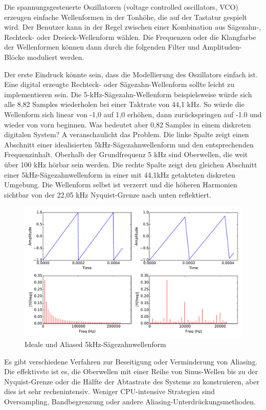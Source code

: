 Die spannungsgesteuerte Oszillatoren (voltage controlled oscillators, VCO) erzeugen einfache Wellenformen in der Tonhöhe, die auf der Tastatur gespielt wird. Der Benutzer kann in der Regel zwischen einer Kombination aus Sägezahn-, Rechteck- oder Dreieck-Wellenform wählen. Die Frequenzen oder die Klangfarbe der Wellenformen können dann durch die folgenden Filter und Amplituden-Blöcke moduliert werden.

Der erste Eindruck könnte sein, dass die Modellierung des Oszillators einfach ist. Eine digital erzeugte Rechteck- oder Sägezahn-Wellenform sollte leicht zu implementieren sein. Die 5-kHz-Sägezahn-Wellenform beispielsweise würde sich alle 8,82 Samples wiederholen bei einer Taktrate von 44,1 kHz. So würde die Wellenform sich linear von -1,0 auf 1,0 erhöhen, dann zurückspringen auf -1.0 und wieder von vorn beginnen.  Was bedeutet aber 0,82 Samples in einem diskreten digitalen System? A veranschaulicht das Problem. Die linke Spalte zeigt einen Abschnitt einer idealisierten 5kHz-Sägezahnwellenform und den entsprechenden Frequenzinhalt. Oberhalb der Grundfrequenz 5 kHz sind Oberwellen, die weit über 100 kHz hörbar sein werden. Die rechte Spalte zeigt den gleichen Abschnitt einer 5kHz-Sägezahnwellenform in einer mit 44,1kHz getakteten diskreten Umgebung. Die Wellenform selbst ist verzerrt und die höheren Harmonien sichtbar von der 22,05 kHz Nyquist-Grenze nach unten reflektiert.


\begin{figure}[H]
    \centering
    \includegraphics[width=\textwidth]{plots/graphics/sawtooth.pdf}
    \caption{Ideale und Aliased 5kHz-Sägezahnwellenform}
    \label{fig:aliasing_sawtooth}
\end{figure}

Es gibt verschiedene Verfahren zur Beseitigung oder Verminderung von Aliasing. Die effektivste ist es, die Oberwellen mit einer Reihe von Sinus-Wellen bis zu der Nyquist-Grenze oder die Hälfte der Abtastrate des Systems zu konstruieren, aber dies ist sehr rechenintensiv. Weniger CPU-intensive Strategien sind Oversampling,  Bandbegrenzung oder andere Aliasing-Unterdrückungsmethoden.





